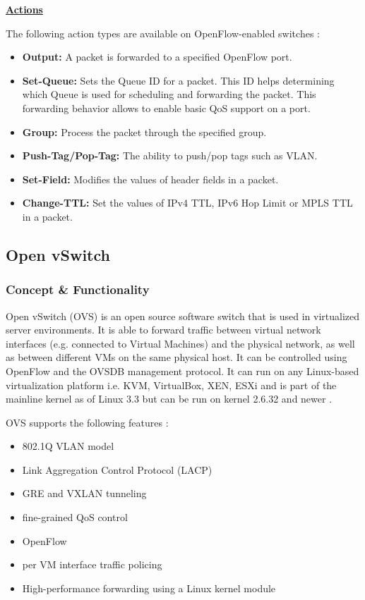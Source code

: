 \underline{\textbf{Actions}}

The following action types are available on OpenFlow-enabled switches \cite{ofspecification}:
\begin{itemize}
\item \textbf{Output:} A packet is forwarded to a specified OpenFlow port.
\item \textbf{Set-Queue:} Sets the Queue ID for a packet. This ID helps determining which Queue is used for scheduling and forwarding the packet. This forwarding behavior allows to enable basic QoS support on a port.
\item \textbf{Group:} Process the packet through the specified group.
\item \textbf{Push-Tag/Pop-Tag:} The ability to push/pop tags such as VLAN.
\item \textbf{Set-Field:} Modifies the values of header fields in a packet.
\item \textbf{Change-TTL:} Set the values of IPv4 TTL, IPv6 Hop Limit or MPLS TTL in a packet.
\end{itemize} 

\subsection{Open vSwitch}

\subsubsection{Concept \& Functionality}

Open vSwitch (OVS) is an open source software switch that is used in virtualized server environments. It is able to forward traffic between virtual network interfaces (e.g. connected to Virtual Machines) and the physical network, as well as between different VMs on the same physical host. It can be controlled using OpenFlow and the OVSDB management protocol. It can run on any Linux-based virtualization platform i.e. KVM, VirtualBox, XEN, ESXi and is part of the mainline kernel as of Linux 3.3 but can be run on kernel 2.6.32 and newer \cite{ovs-faq}.

OVS supports the following features \cite{ovs-readme}:
\begin{itemize}
\item 802.1Q VLAN model
\item Link Aggregation Control Protocol (LACP)
\item GRE and VXLAN tunneling
\item fine-grained QoS control
\item OpenFlow
\item per VM interface traffic policing
\item High-performance forwarding using a Linux kernel module
\end{itemize}

